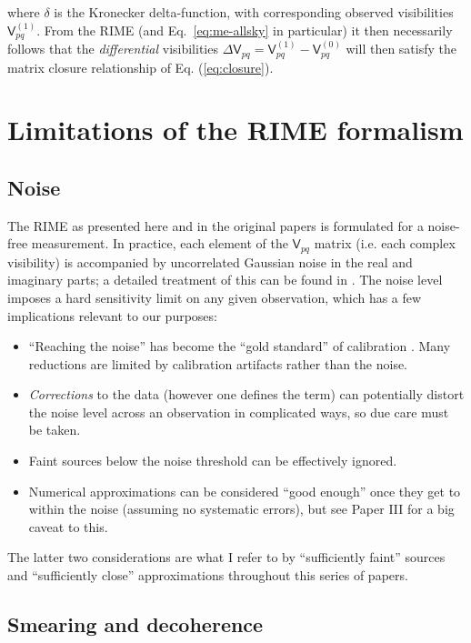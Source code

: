\documentclass{aa}
\newcommand{\coh}[2]{\mathsf{{#1}}_{{#2}}}
\begin{document}
where $\delta$ is the Kronecker delta-function, with corresponding observed visibilities $\coh{V}{pq}^{(1)}$. From the RIME (and Eq.~\ref{eq:me-allsky} in particular) it then necessarily follows that the \emph{differential} visibilities $\Delta\coh{V}{pq}=\coh{V}{pq}^{(1)} - \coh{V}{pq}^{(0)}$ will then satisfy the matrix closure relationship of Eq. (\ref{eq:closure}).


\section{Limitations of the RIME formalism\label{sec:rime-limitations}}

\subsection{\label{sec:noise}Noise}

The RIME as presented here and in the original papers is formulated for a noise-free measurement. In practice, each element of the $\coh{V}{pq}$ matrix (i.e. each complex visibility) is accompanied by uncorrelated Gaussian noise in the real and imaginary parts; a detailed treatment of this can be found in \citet[Sect.~6.2]{tms}. The noise level imposes a hard sensitivity limit on any given observation, which has a few implications relevant to our purposes:

\begin{itemize}
\item ``Reaching the noise'' has become the ``gold standard'' of calibration \citep[see Paper II,][]{RRIME2}. 
Many reductions are limited by calibration artifacts rather than the noise.
\item {\em Corrections} to the data (however one defines the term) can potentially distort the noise level across an observation in complicated ways, so due care must be taken.
\item Faint sources below the noise threshold can be effectively ignored.
\item Numerical approximations can be considered ``good enough'' once they get to within the noise (assuming no systematic errors), but see Paper III \citep[Sect.~2.6, Fig.~17]{RRIME3} for a big caveat to this.
\end{itemize}

The latter two considerations are what I refer to by ``sufficiently faint'' sources and ``sufficiently close'' approximations throughout this series of papers.

\subsection{\label{sec:smearing}Smearing and decoherence}
\end{document}
